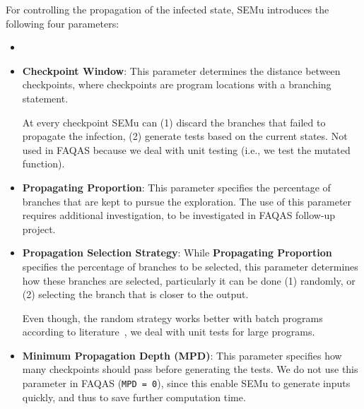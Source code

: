 \begin{itemize}
	
	For controlling the propagation of the infected state, SEMu introduces the following four parameters:
	\begin{itemize}
		\item {}

		\item \textbf{Checkpoint Window}: This parameter determines the distance between checkpoints, where checkpoints are program locations with a branching statement. 

		At every checkpoint SEMu can (1) discard the branches that failed to propagate the infection, (2) generate tests based on the current states. Not used in FAQAS because we deal with unit testing (i.e., we test the mutated function).
		
		\item \textbf{Propagating Proportion}: This parameter specifies the percentage of branches that are kept to pursue the exploration. The use of this parameter requires additional investigation, to be investigated in FAQAS follow-up project.


		\item \textbf{Propagation Selection Strategy}: While \textbf{Propagating Proportion} specifies the percentage of branches to be selected, this parameter determines how these branches are selected, particularly it can be done (1) randomly, or (2) selecting the branch that is closer to the output. 

		Even though, the random strategy works better with batch programs according to literature~\cite{chekam2021killing}, we deal with unit tests for large programs. 

		\item \textbf{Minimum Propagation Depth (MPD)}: This parameter specifies how many checkpoints should pass before generating the tests. We do not use this parameter in FAQAS (\texttt{MPD = 0}), since this enable SEMu to generate inputs quickly, and thus to save further computation time. 
	\end{itemize}


\end{itemize}
